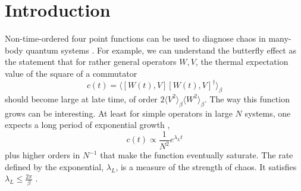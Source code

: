 \documentclass[12pt]{article}
\newcommand{\be}{\begin{equation}}
\newcommand{\ee}{\end{equation}}
\renewcommand{\title}[1]{\vbox{\center\bf{\Large{#1}}}\vspace{5mm}}
\renewcommand{\author}[1]{\vbox{\center#1}\vspace{5mm}}
\newcommand{\address}[1]{\vbox{\center\em#1}}
\newcommand{\email}[1]{\vbox{\center\tt#1}\vspace{5mm}}
\begin{document}

\tableofcontents

\baselineskip=17.63pt 


\section{Introduction}
Non-time-ordered four point functions can be used to diagnose chaos in many-body quantum systems  \cite{larkin,Almheiri:2013hfa,SS,Shenker:2013yza,Roberts:2014isa,kitaev,Shenker:2014cwa,Roberts:2014ifa}. For example, we can understand the butterfly effect as the statement that for rather general operators $W,V$, the thermal expectation value of the square of a commutator
\be
c(t) = \langle [W(t),V] [W(t),V]^\dagger\rangle_\beta
\ee
should become large at late time, of order $2\langle V^2\rangle_\beta \langle W^2\rangle_\beta$. The way this function grows can be interesting. At least for simple operators in large $N$ systems, one expects a long period of exponential growth \cite{kitaev},
\be
c(t) \propto \frac{1}{N^2} e^{\lambda_L t}
\ee
plus higher orders in $N^{-1}$ that make the function eventually saturate. The rate defined by the exponential, $\lambda_L$, is a measure of the strength of chaos. It satisfies $\lambda_L \le \frac{2\pi}{\beta}$ \cite{Maldacena:2015waa}.
\end{document}
